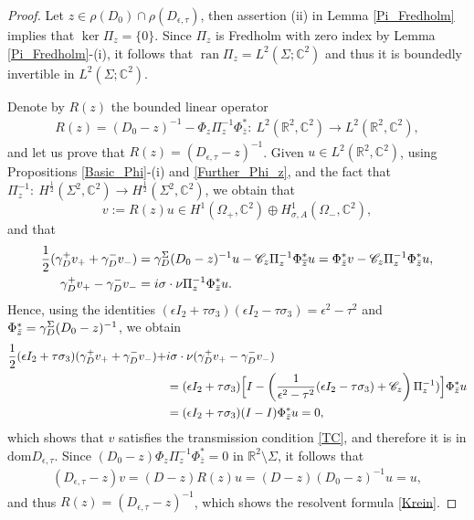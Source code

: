 \documentclass[11pt,a4paper,reqno,oneside]{amsproc}
\DeclareMathOperator{\dom}{dom}
\DeclareMathOperator{\ran}{ran}
\def \rr {{\mathbb R}}
\def \cc {{\mathbb C}}
\numberwithin{equation}{section}
\def\dom{\mathrm{dom}}
\def \cc {{\mathbb{C}}}
\begin{document}
\begin{proof}
 Let $z \in \rho(D_0)\cap \rho(D_{\epsilon, \tau})$, then assertion (ii) in Lemma \ref{Pi_Fredholm} implies that $\ker \Pi_z=\{0\}$. Since $\Pi_z$ is Fredholm with zero index by Lemma \ref{Pi_Fredholm}-(i), it follows that $\ran \Pi_z=L^2(\Sigma; \mathbb{C}^2)$ and thus it is boundedly invertible in $L^2(\Sigma; \mathbb{C}^2)$. 
 
Denote by $R(z)$ the bounded linear operator
\begin{align*}\label{Kresolvent1}
	R(z)= (D_0-z)^{-1} - \Phi_{z}\Pi_{z}^{-1} \Phi^{\ast}_{\overline{z}}:\ L^2(\rr^2,\cc^2)\to L^2(\rr^2,\cc^2),
\end{align*}
and let us prove that $R(z)=(D_{\epsilon,\tau}-z)^{-1}$. Given $u\in L^2(\rr^2,\cc^2)$, using Propositions \ref{Basic_Phi}-(i) and \ref{Further_Phi_z}, and the fact that $\Pi_z^{-1}: \ H^{\frac{1}{2}}(\Sigma^2,\cc^2)\to H^{\frac{1}{2}}(\Sigma^2,\cc^2)$, we obtain that
\[
v:=R(z)u\in H^1(\Omega_+,\cc^2)\oplus H^1_{\sigma, A}(\Omega_-,\cc^2),
\]
and that
\begin{align*}
\frac{1}{2}(\gamma_D^+v_+ + \gamma_D^-v_-)&=\gamma_D^\Sigma(D_0-z)^{-1} u -\mathscr{C}_z \Pi_{z}^{-1} \Phi^*_{\overline{z}}u
=\Phi^*_{\Bar{z}}v-\mathscr{C}_z \Pi_{z}^{-1} \Phi^*_{\Bar{z}}u,\\
\gamma_D^+ v_+ -\gamma_D^- v_- &=i\sigma\cdot\nu\Pi_{z} ^{-1} \Phi^*_{\Bar{z}}u.
\end{align*}
Hence, using the identities $(\epsilon I_2 + \tau\sigma_{3})(\epsilon I_2 - \tau\sigma_3)=\epsilon^{2} - \tau^{2}$  and $\Phi^*_{\Bar{z}}=\gamma_D^\Sigma(D_0-z)^{-1}$, we obtain
\begin{align*}
\frac{1}{2}(\epsilon I_2+\tau\sigma_3)(\gamma_D^+ v_+ +\gamma_D^- v_-)+ &i\sigma\cdot\nu(\gamma_D^+ v_+ -\gamma_D^- v_-)\\
&=(\epsilon I_2 + \tau\sigma_{3})\Big[I-\left(\frac{1}{\epsilon^{2} - \tau^{2}}(\epsilon I_2 - \tau\sigma_3)+\mathscr{C}_z \right)\Pi_z^{-1})\Big] \Phi^*_{\Bar{z}}u\\
&=(\epsilon I_2 + \tau\sigma_{3})(I-I)\Phi^*_{\Bar{z}}u=0,
\end{align*}
which  shows that $v$ satisfies the transmission condition \eqref{TC}, and therefore it  is in $\dom D_{\epsilon,\tau}$. Since  $(D_0-z)\Phi_{z}\Pi_{z}^{-1} \Phi^{\ast}_{\overline{z}}=0$ in $\rr^2\setminus\Sigma$, it follows that
\begin{align*}
(D_{\epsilon,\tau}-z)v=(D-z)R(z)u=(D-z)(D_0-z)^{-1}u=u,
\end{align*}
and thus $R(z)=(D_{\epsilon,\tau}-z)^{-1}$, which shows the resolvent formula \eqref{Krein}.


\end{proof}
\end{document}
